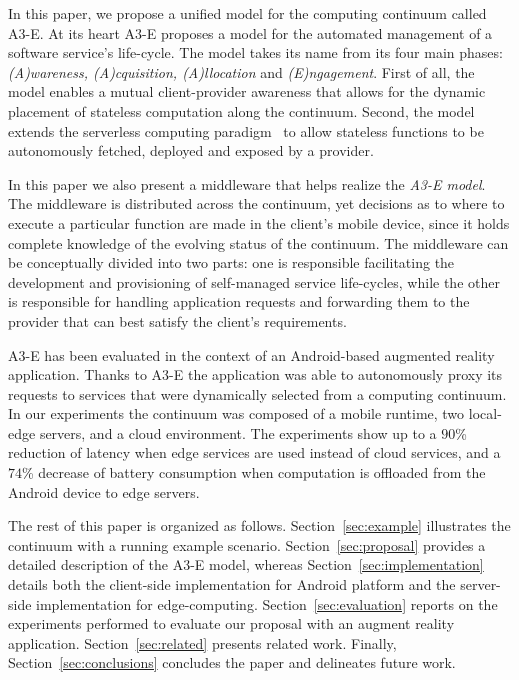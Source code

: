 In this paper, we propose a unified model for the computing continuum called A3-E. At its heart A3-E proposes a model for the automated management of a software service's life-cycle. The model takes its name from its four main phases: \textit{(A)wareness, (A)cquisition, (A)llocation} and \textit{(E)ngagement}. First of all, the model enables a mutual client-provider awareness that allows for the dynamic placement of stateless computation along the continuum. Second, the model extends the serverless computing paradigm~\cite{Hendrickson:2016,baldini2017serverless,GarrigaMendonca2017} to allow stateless functions to be autonomously fetched, deployed and exposed by a provider. 

In this paper we also present a middleware that helps realize the \textit{A3-E model}. The middleware is distributed across the continuum, yet decisions as to where to execute a particular function are made in the client's mobile device, since it holds complete knowledge of the evolving status of the continuum. The middleware can be conceptually divided into two parts: one is responsible facilitating the development and provisioning of self-managed service life-cycles, while the other is responsible for handling application requests and forwarding them to the provider that can best satisfy the client's requirements.



A3-E has been evaluated in the context of an Android-based augmented reality application. Thanks to A3-E the application was able to autonomously proxy its requests to services that were dynamically selected from a computing continuum. In our experiments the continuum was composed of a mobile runtime, two local-edge servers, and a cloud environment. The experiments show up to a $90$\% reduction of latency when edge services are used instead of cloud services, and a $74$\% decrease of battery consumption when computation is offloaded from the Android device to edge servers. 

The rest of this paper is organized as follows.  Section~\ref{sec:example} illustrates the continuum with a running example scenario. Section~\ref{sec:proposal} provides a detailed description of the A3-E model, whereas Section~\ref{sec:implementation} details both the client-side implementation for Android platform and the server-side implementation for edge-computing. Section~\ref{sec:evaluation} reports on the experiments performed to evaluate our proposal with an augment reality application. Section~\ref{sec:related} presents related work. Finally, Section~\ref{sec:conclusions} concludes the paper and delineates future work.

